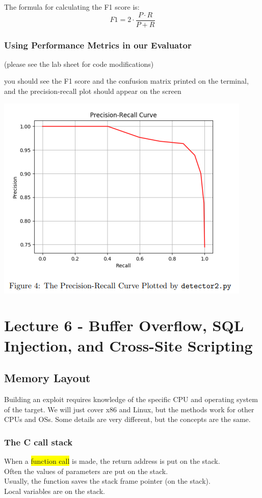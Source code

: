 \documentclass[]{project_plan}
\begin{document}
The formula for calculating the F1 score is:
\[
  F1 = 2 \cdot \frac{P \cdot R}{P + R}
\]

\subsection{Using Performance Metrics in our Evaluator}

(please see the lab sheet for code modifications)

you should see the F1 score and the confusion matrix
printed on the terminal, and the precision-recall plot should appear on the
screen

\includegraphics[width=.6\linewidth]{lab5 prec curve.png}

\chapter{Lecture 6 - Buffer Overflow, SQL Injection, and Cross-Site Scripting}



\section{Memory Layout}

Building an exploit requires knowledge of the specific CPU and operating system of
the target.
We will just cover x86 and Linux, but the methods work for other CPUs and OSs.
Some details are very different, but the concepts are the same.

\subsection{The C call stack}

When a \colorbox{yellow}{function call} is made, the return address is put on the stack.\\
Often the values of parameters are put on the stack.\\
Usually, the function saves the stack frame pointer (on the stack).\\
Local variables are on the stack.
\end{document}
